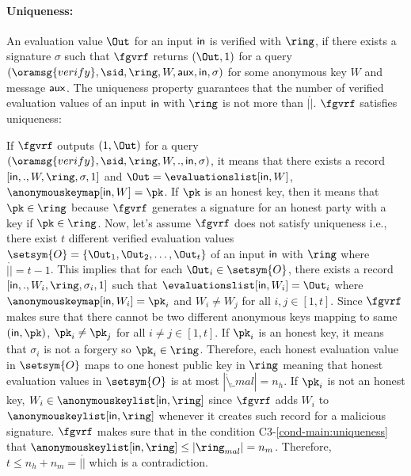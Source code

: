 	\paragraph{Uniqueness:} An evaluation value $ \Out $ for an input $ \mathsf{in} $  is verified with $ \ring $, if there exists a signature $ \sigma $ such that $ \fgvrf$ returns $ (\Out, 1)$ for a query $ (\oramsg{verify}, \sid, \ring,W,\aux,\msg,\sigma)$ for some anonymous key $ W $ and message $\mathsf{aux} $. The uniqueness property guarantees that the number of verified evaluation values of an input $ \mathsf{in} $ with $ \ring $ is not more than $ |\ring| $. $ \fgvrf $ satisfies uniqueness:
	
	If $ \fgvrf $ outputs $ (1,\Out) $ for a query $ (\oramsg{verify}, \sid, \ring,W,.,\msg,\sigma)$, it means that there exists a record $ [\msg, ., W,\ring, \sigma,1] $ and $ \Out = \evaluationslist[\msg, W] $, $ \anonymouskeymap[\msg, W]  = \pk$.  If $ \pk $ is an honest key, then it means that $ \pk \in \ring $ because $ \fgvrf $ generates a signature for an honest party with a key if $ \pk \in \ring $. Now,  let's assume $ \fgvrf $ does not satisfy uniqueness i.e.,
	there exist $ t$ different verified evaluation values $ \setsym{O} = \{\Out_1, \Out_2, \ldots, \Out_t\} $ of an input $ \mathsf{in} $ with $ \ring $ where $ |\ring| = t-1 $. This implies that for each $ \Out_i \in \setsym{O} $, there exists a  record $ [\msg, ., W_i,\ring,\sigma_i,1] $ such that  $\evaluationslist[\msg,W_i] = \Out_i $ where $ \anonymouskeymap[\msg,W_i] = \pk_i $ and $ W_i \neq W_j $ for all $ i,j \in [1,t] $. Since $ \fgvrf $ makes sure that there cannot be two different anonymous keys mapping to same $ (\msg, \pk) $,  $ \pk_i \neq \pk_j $ for all $ i \neq j \in [1,t] $.
	If $ \pk_i $ is an honest key, it means that $ \sigma_i $ is not a forgery so $ \pk_i \in \ring $. Therefore, each honest evaluation value  in $ \setsym{O} $ maps to one honest public key in $ \ring $ meaning that honest evaluation values in $ \setsym{O} $ is at most $ |\ring \setminus \ring_{mal}| = n_h $. If $ \pk_i $ is not an honest  key, $ W_i \in \anonymouskeylist[\msg,\ring] $ since $ \fgvrf $ adds $ W_i $ to $ \anonymouskeylist[\msg, \ring] $ whenever it creates such record for a malicious signature. $ \fgvrf $ makes sure that in the condition C3-\ref{cond-main:uniqueness} that $ \anonymouskeylist[\msg,\ring] \leq |\ring_{mal}| = n_m$. Therefore, $ t \leq n_h + n_m = |\ring| $ which is a contradiction.
	
	
